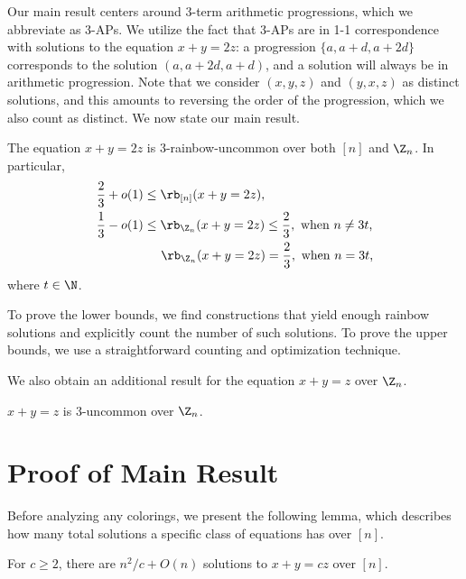 Our main result centers around 3-term arithmetic progressions, which we abbreviate as $3$-APs.
We utilize the fact that $3$-APs are in 1-1 correspondence
with solutions to the equation $x + y = 2z$:
a progression $\{a, a + d, a + 2d\}$ corresponds to the solution $(a, a + 2d, a + d)$,
and a solution will always be in arithmetic progression.
Note that we consider $(x,y,z)$ and $(y,x,z)$ as distinct solutions,
and this amounts to reversing the order of the progression,
which we also count as distinct.
We now state our main result.
\begin{theorem}\label{thm-main}
The equation $x + y = 2z$ is $3$-rainbow-uncommon over both $[n]$ and $\Z_n$.
In particular,
\begin{align}
\frac{2}{3} + o(1) &\leq \rb_{[n]}(x + y = 2z), \label{result-n}\\
\frac{1}{3} - o(1) &\leq \rb_{\Z_n}(x + y = 2z) \leq \frac{2}{3}, \text{ when $n \neq 3t$,} \label{result-Zn-not}\\
&\;\;\;\;\; \rb_{\Z_n}(x + y = 2z) = \frac{2}{3}, \text{ when $n = 3t$,} \label{result-Zn-is}
\end{align}
where $t \in \N$.
\end{theorem}
To prove the lower bounds, we find constructions that yield enough rainbow solutions
and explicitly count the number of such solutions. To prove the upper bounds, we use a straightforward
counting and optimization technique.

We also obtain an additional result for the equation $x + y = z$ over $\Z_n$.
\begin{theorem}
$x + y = z$ is 3-uncommon over $\Z_n$. 
\end{theorem}


\section{Proof of Main Result}

Before analyzing any colorings, we present the following lemma,
which describes how many total solutions a specific class of equations has over $[n]$.

\begin{lemma}\label{lem-soln-n}
For $c \geq 2$, there are $n^2/c + O(n)$ solutions to $x + y = cz$ over $[n]$.
\end{lemma}

